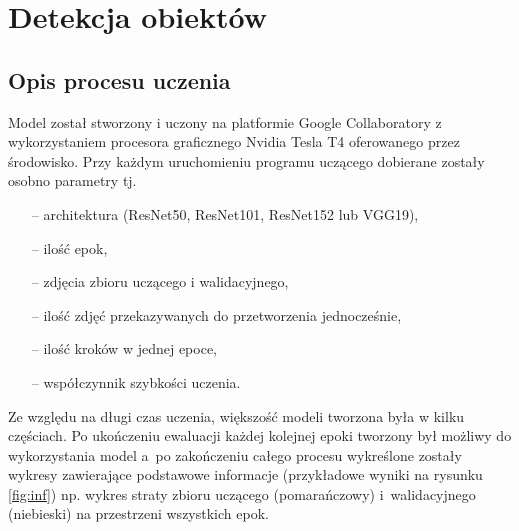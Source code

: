 \chapter{Detekcja obiektów}
\section{Opis procesu uczenia}
\label{opis}

\hspace{0.5cm}
Model został stworzony i uczony na platformie Google Collaboratory z wykorzystaniem procesora graficznego Nvidia Tesla T4 oferowanego przez środowisko. Przy każdym uruchomieniu programu uczącego dobierane zostały osobno parametry tj.
\begin{itemize}
    \item[--] architektura (ResNet50, ResNet101, ResNet152 lub VGG19),
    \item[--] ilość epok,
    \item[--] zdjęcia zbioru uczącego i walidacyjnego,
    \item[--] ilość zdjęć przekazywanych do przetworzenia jednocześnie,
    \item[--] ilość kroków w jednej epoce,
    \item[--] współczynnik szybkości uczenia.
\end{itemize}

\hspace{0.5cm}
Ze względu na długi czas uczenia, większość modeli tworzona była w kilku częściach. Po ukończeniu ewaluacji każdej kolejnej epoki tworzony był możliwy do wykorzystania model a~po zakończeniu całego procesu wykreślone zostały wykresy zawierające podstawowe informacje (przykładowe wyniki na rysunku \ref{fig:inf}) np. wykres straty zbioru uczącego (pomarańczowy) i~walidacyjnego (niebieski) na przestrzeni wszystkich epok.

